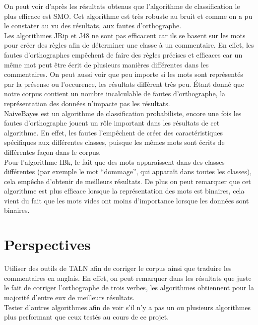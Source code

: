 \documentclass[a4paper,11pt]{report}
\begin{document}
On peut voir d'après les résultats obtenus que l'algorithme de classification le plus efficace est SMO. Cet algorithme est très robuste au bruit et comme on a pu le constater au vu des résultats, aux fautes d'orthographe.\\

Les algorithmes JRip et J48 ne sont pas efficacent car ils se basent sur les mots pour créer des règles afin de déterminer une classe à un commentaire. En effet, les fautes d'orthographes empêchent de faire des règles précises et efficaces car un même mot peut être écrit de plusieurs manières différentes dans les commentaires.
On peut aussi voir que peu importe si les mots sont représentés par la présense ou l'occurence, les résultats diffèrent très peu. \'{E}tant donné que notre corpus contient un nombre incalculable de fautes d'orthographe, la représentation des données n'impacte pas les résultats.\\

NaiveBayes est un algorithme de classification probabiliste, encore une fois les fautes d'orthographe jouent un rôle important dans les résultats de cet algorithme. En effet, les fautes l'empêchent de créer des caractéristiques spécifiques aux différentes classes, puisque les mêmes mots sont écrits de différentes façon dans le corpus.\\

Pour l'algorithme IBk, le fait que des mots apparaissent dans des classes différentes (par exemple le mot ``dommage'', qui apparaît dans toutes les classes), cela empêche d'obtenir de meilleurs résultats. De plus on peut remarquer que cet algorithme est plus efficace lorsque la représentation des mots est binaires, cela vient du fait que les mots vides ont moins d'importance lorsque les données sont binaires.

\section{Perspectives}
Utiliser des outils de TALN afin de corriger le corpus ainsi que traduire les commentaires en anglais. En effet, on peut remarquer dans les résultats que juste le fait de corriger l'orthographe de trois verbes, les algorithmes obtiennent pour la majorité d'entre eux de meilleurs résultats.\\


Tester d'autres algorithmes afin de voir s'il n'y a pas un ou plusieurs algorithmes plus performant que ceux testés au cours de ce projet.
\end{document}
